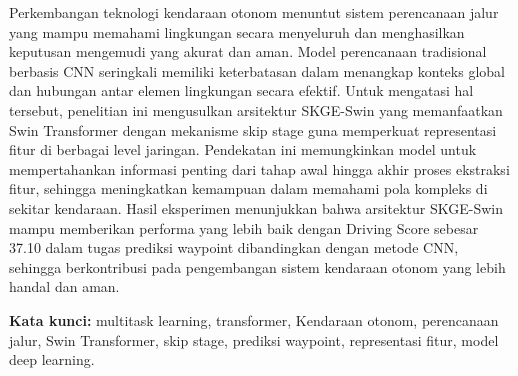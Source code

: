 \vspace{-1cm}

Perkembangan teknologi kendaraan otonom menuntut sistem perencanaan jalur yang mampu memahami lingkungan secara menyeluruh dan menghasilkan keputusan mengemudi yang akurat dan aman. Model perencanaan tradisional berbasis CNN seringkali memiliki keterbatasan dalam menangkap konteks global dan hubungan antar elemen lingkungan secara efektif. Untuk mengatasi hal tersebut, penelitian ini mengusulkan arsitektur SKGE-Swin yang memanfaatkan Swin Transformer dengan mekanisme skip stage guna memperkuat representasi fitur di berbagai level jaringan. Pendekatan ini memungkinkan model untuk mempertahankan informasi penting dari tahap awal hingga akhir proses ekstraksi fitur, sehingga meningkatkan kemampuan dalam memahami pola kompleks di sekitar kendaraan. Hasil eksperimen menunjukkan bahwa arsitektur SKGE-Swin mampu memberikan performa yang lebih baik dengan Driving Score sebesar 37.10 dalam tugas prediksi waypoint dibandingkan dengan metode CNN, sehingga berkontribusi pada pengembangan sistem kendaraan otonom yang lebih handal dan aman.

\vspace{0.5cm}
\textbf{Kata kunci:} multitask learning, transformer,  Kendaraan otonom, perencanaan jalur, Swin Transformer, skip stage, prediksi waypoint, representasi fitur, model deep learning.
